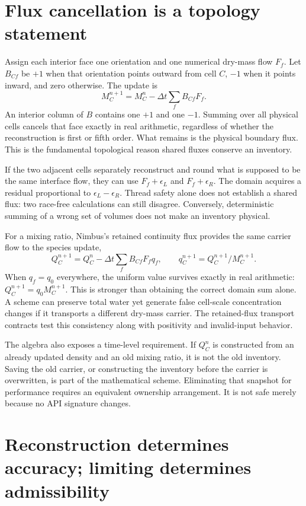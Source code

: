 \section{Flux cancellation is a topology statement}

Assign each interior face one orientation and one numerical dry-mass flow $F_f$.
Let $B_{Cf}$ be $+1$ when that orientation points outward from cell $C$, $-1$
when it points inward, and zero otherwise. The update is
\[
 M_C^{n+1}=M_C^n-\Delta t\sum_f B_{Cf}F_f.
\]
An interior column of $B$ contains one $+1$ and one $-1$. Summing over all
physical cells cancels that face exactly in real arithmetic, regardless of
whether the reconstruction is first or fifth order. What remains is the
physical boundary flux. This is the fundamental topological reason shared
fluxes conserve an inventory.

If the two adjacent cells separately reconstruct and round what is supposed to
be the same interface flow, they can use $F_f+\epsilon_L$ and
$F_f+\epsilon_R$. The domain acquires a residual proportional to
$\epsilon_L-\epsilon_R$. Thread safety alone does not establish a shared flux:
two race-free calculations can still disagree. Conversely, deterministic
summing of a wrong set of volumes does not make an inventory physical.

For a mixing ratio, Nimbus's retained continuity flux provides the same carrier
flow to the species update,
\[
 Q_C^{n+1}=Q_C^n-\Delta t\sum_f B_{Cf}F_f q_f,
 \qquad q_C^{n+1}=Q_C^{n+1}/M_C^{n+1}.
\]
When $q_f=q_0$ everywhere, the uniform value survives exactly in real arithmetic:
$Q_C^{n+1}=q_0 M_C^{n+1}$. This is stronger than obtaining the correct domain
sum alone. A scheme can preserve total water yet generate false cell-scale
concentration changes if it transports a different dry-mass carrier. The
retained-flux transport contracts test this consistency along with positivity
and invalid-input behavior.

The algebra also exposes a time-level requirement. If $Q_C^n$ is constructed
from an already updated density and an old mixing ratio, it is not the old
inventory. Saving the old carrier, or constructing the inventory before the
carrier is overwritten, is part of the mathematical scheme. Eliminating that
snapshot for performance requires an equivalent ownership arrangement. It is
not safe merely because no API signature changes.

\section{Reconstruction determines accuracy; limiting determines admissibility}

